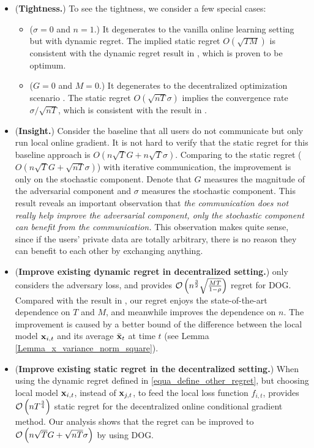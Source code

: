 \documentclass{article}
\begin{document}
\begin{itemize}
\item ({\bf Tightness.}) To see the tightness, we consider a few special cases:
\begin{itemize}
\item ($\sigma= 0$ and $n=1$.) It degenerates to the vanilla online learning setting but with dynamic regret. The implied static regret $O(\sqrt{TM})$ is consistent with the dynamic regret result in \citet{Zhao:2018wx}, which is proven to be optimum. 
\item ($G=0$ and $M=0$.) It degenerates to the decentralized optimization scenario \citet{Tang:2018un}. The static regret $O(\sqrt{nT}\sigma)$ implies the convergence rate $\sigma / \sqrt{nT}$, which is consistent with the result in \citet{Tang:2018un}. 
\end{itemize}
\item ({\bf Insight.}) Consider the baseline that all users do not communicate but only run local online gradient. It is not hard to verify that the static regret for this baseline approach is $O(n\sqrt{T}G + n\sqrt{T}\sigma)$. Comparing to the static regret ($O(n\sqrt{T}G + \sqrt{nT}\sigma)$) with iterative communication, the improvement is only on the stochastic component. Denote that $G$ measures the magnitude of the adversarial component and $\sigma$ measures the stochastic component. This result reveals an important observation that \emph{the communication does not really help improve the adversarial component, only the stochastic component can benefit from the communication.} This observation makes quite sense, since if the users' private data are totally arbitrary, there is no reason they can benefit to each other by exchanging anything.
\item ({\bf Improve existing dynamic regret in decentralized setting.}) \citet{8015179Shahram} only considers the adversary loss, and provides ${\mathcal{O}\left( n^{\frac{3}{2}}\sqrt{\frac{MT}{1-\rho}}  \right)}$ regret for DOG. Compared with the result in \citet{8015179Shahram}, our regret enjoys the state-of-the-art dependence on $T$ and $M$, and meanwhile improves the dependence on $n$. The improvement is caused by a better bound of the difference between the local model ${\bf x}_{i,t}$ and its average $\bar{{\bf x}}_t$ at time $t$ (see Lemma \ref{Lemma_x_variance_norm_square}). 
\item ({\bf Improve existing static regret in the decentralized setting.}) When using the dynamic regret defined in \eqref{equa_define_other_regret}, but choosing local model ${\bf x}_{i,t}$, instead of ${\bf x}_{j,t}$, to feed the local loss function $f_{i,t}$, \citet{pmlr-v70-zhang17g} provides ${\mathcal{O}\left( n T^{\frac{3}{4}} \right)}$ static regret for the decentralized online conditional gradient method. Our analysis shows that the regret can be improved to ${\mathcal{O}\left( n\sqrt{T}G+\sqrt{nT}\sigma \right)}$ by using DOG. 
\end{itemize} 
\end{document}
